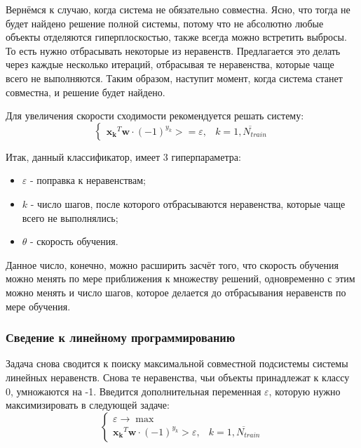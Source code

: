 \documentclass[a4paper]{article}
\newcommand{\w}{\bm{w}}
\newcommand{\yk}{y_k}
\newcommand{\xk}{\bm{x_k}}
\begin{document}
Вернёмся к случаю, когда система не обязательно совместна. Ясно, что тогда не будет найдено решение полной системы, потому что не абсолютно любые объекты отделяются гиперплоскостью, также всегда можно встретить выбросы. То есть нужно отбрасывать некоторые из неравенств. Предлагается это делать через каждые несколько итераций, отбрасывая те неравенства, которые чаще всего не выполняются. Таким образом, наступит момент, когда система станет совместна, и решение будет найдено.

Для увеличения скорости сходимости рекомендуется решать систему:
\begin{equation}
\begin{cases}
\xk^T\w \cdot (-1) ^ {\yk} >= \varepsilon, & k = \overline{1,N_{train}} 
\end{cases}
\end{equation}

Итак, данный классификатор, имеет 3 гиперпараметра: 
\begin{itemize}
\item $\varepsilon$ - поправка к неравенствам;
\item $k$ - число шагов, после которого отбрасываются неравенства, которые чаще всего не выполнялись;
\item $\theta$ - скорость обучения.
\end{itemize}

Данное число, конечно, можно расширить засчёт того, что скорость обучения можно менять по мере приближения к множеству решений, одновременно с этим можно менять и число шагов, которое делается до отбрасывания неравенств по мере обучения.

\subsubsection{Сведение к линейному программированию}

Задача снова сводится к поиску максимальной совместной подсистемы системы линейных неравенств. Снова те неравенства, чьи объекты принадлежат к классу 0, умножаются на -1. Введится дополнительная переменная $\varepsilon$, которую нужно максимизировать в следующей задаче:
\begin{equation}
\begin{cases}
\varepsilon \rightarrow \max \\
\xk^T\w \cdot (-1)^{y_k} > \varepsilon, & k = \overline{1, N_{train}}
\end{cases}
\end{equation}
\end{document}
